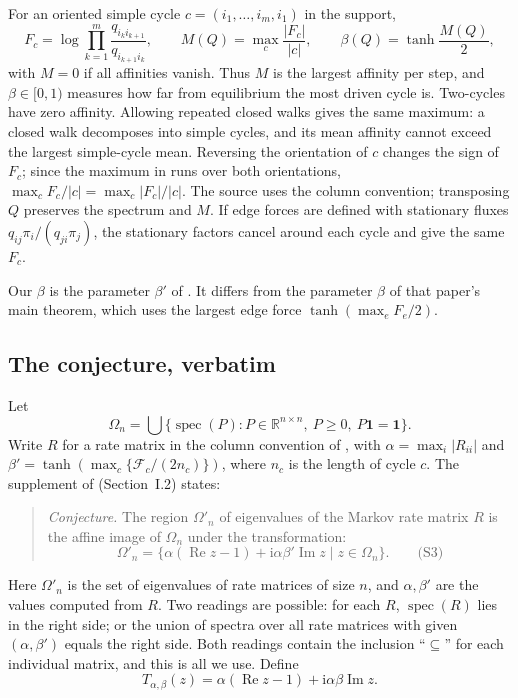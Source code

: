 \documentclass[11pt,a4paper]{article}
\numberwithin{equation}{section}
\theoremstyle{definition}
\theoremstyle{remark}
\newcommand{\ii}{\mathrm{i}}
\newcommand{\one}{\mathbf{1}}
\newcommand{\spec}{\operatorname{spec}}
\newcommand{\Om}{\Omega}
\begin{document}
For an oriented simple cycle \(c=(i_1,\ldots,i_m,i_1)\) in the support,
\begin{equation}
F_c=\log\prod_{k=1}^{m}
\frac{q_{i_k i_{k+1}}}{q_{i_{k+1}i_k}},\qquad
M(Q)=\max_c\frac{|F_c|}{|c|},\qquad
\beta(Q)=\tanh\frac{M(Q)}2,
\label{eq:affinity}
\end{equation}
with \(M=0\) if all affinities vanish. Thus \(M\) is the largest
affinity per step, and \(\beta\in[0,1)\) measures how far from
equilibrium the most driven cycle is. Two-cycles have zero affinity.
Allowing repeated closed walks gives the same maximum: a closed walk
decomposes into simple cycles, and its mean affinity cannot exceed the
largest simple-cycle mean. Reversing the orientation of \(c\) changes
the sign of \(F_c\); since the maximum in \cite{xu2025} runs over both
orientations, \(\max_c F_c/|c|=\max_c|F_c|/|c|\). The source uses the
column convention; transposing \(Q\) preserves the spectrum and \(M\).
If edge forces are defined with stationary fluxes
\(q_{ij}\pi_i/(q_{ji}\pi_j)\), the stationary factors cancel around
each cycle and give the same \(F_c\).

Our \(\beta\) is the parameter \(\beta'\) of \cite[Supplement]{xu2025}.
It differs from the parameter \(\beta\) of that paper's main theorem,
which uses the largest edge force \(\tanh(\max_e F_e/2)\).

\subsection{The conjecture, verbatim}

Let
\begin{equation}
\Om_n=\bigcup\{\spec(P):P\in\mathbb R^{n\times n},\ P\geq0,\ P\one=\one\}.
\label{eq:omega}
\end{equation}
Write \(R\) for a rate matrix in the column convention of
\cite{xu2025}, with \(\alpha=\max_i|R_{ii}|\) and
\(\beta'=\tanh(\max_c\{\mathcal F_c/(2n_c)\})\), where \(n_c\) is the
length of cycle \(c\). The supplement of \cite{xu2025} (Section~I.2)
states:

\begin{quote}
\emph{Conjecture.} The region \(\Om'_n\) of eigenvalues of the Markov
rate matrix \(R\) is the affine image of \(\Om_n\) under the
transformation:
\[
\Om'_n=\bigl\{\alpha(\operatorname{Re}z-1)+\ii\alpha\beta'\operatorname{Im}z
\;\big|\;z\in\Om_n\bigr\}.\qquad\text{(S3)}
\]
\end{quote}

Here \(\Om'_n\) is the set of eigenvalues of rate matrices of size
\(n\), and \(\alpha,\beta'\) are the values computed from \(R\). Two
readings are possible: for each \(R\), \(\spec(R)\) lies in the right
side; or the union of spectra over all rate matrices with given
\((\alpha,\beta')\) equals the right side. Both readings contain the
inclusion ``\(\subseteq\)'' for each individual matrix, and this is all
we use. Define
\begin{equation}
T_{\alpha,\beta}(z)
 =\alpha(\operatorname{Re}z-1)+\ii\alpha\beta\operatorname{Im}z .
\end{equation}
\end{document}
